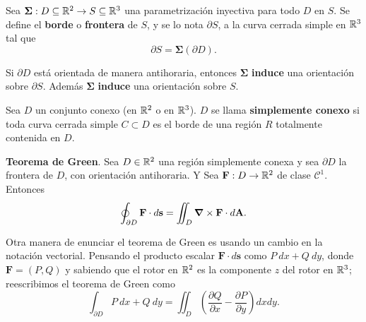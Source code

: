 \begin{definition}
    Sea $\boldsymbol{\Sigma}:D\subseteq\mathbb{R}^2\to S\subseteq\mathbb{R}^3$ una parametrizaci\'on inyectiva para todo $D$ en $S$. Se define el \textbf{borde} o \textbf{frontera} de $S$, y se lo nota $\partial S$, a la curva cerrada simple en $\mathbb{R}^3$ tal que 
    \[
        \partial S=\boldsymbol{\Sigma}(\partial D).
    \]
\end{definition}

\begin{obs} 
    Si $\partial D$ est\'a orientada de manera antihoraria, entonces $\boldsymbol{\Sigma}$ \textbf{induce} una orientaci\'on sobre $\partial S$. Adem\'as $\boldsymbol{\Sigma}$ \textbf{induce} una orientaci\'on sobre $S$.
\end{obs}

\begin{definition}
    Sea $D$ un conjunto conexo (en $\mathbb{R}^2$ o en $\mathbb{R}^3$). $D$ se llama \textbf{simplemente conexo} si toda curva cerrada simple $C\subset D$ es el borde de una regi\'on $R$ totalmente contenida en $D$.
\end{definition}

\begin{theorem}
    \textbf{Teorema de Green}. Sea $D\in\mathbb{R}^2$ una regi\'on simplemente conexa y sea $\partial D$ la frontera de $D$, con orientaci\'on antihoraria. Y Sea $\mathbf{F}:D\to\mathbb{R}^2$ de clase $\mathcal{C}^1$. Entonces
    \[
        \oint_{\partial D}\mathbf{F}\cdot d\mathbf{s} = \iint_D \grad\times\mathbf{F}\cdot d\mathbf{A}.
    \]
\end{theorem}

\begin{obs} 
    Otra manera de enunciar el teorema de Green es usando un cambio en la notaci\'on vectorial. Pensando el producto escalar $\mathbf{F}\cdot d\mathbf{s}$ como $P\:dx+Q\:dy$, donde $\mathbf{F}=(P,Q)$ y sabiendo que el rotor en $\mathbb{R}^2$ es la componente $z$ del rotor en $\mathbb{R}^3$; reescribimos el teorema de Green como
\[
        \int_{\partial D}P\:dx+Q\:dy=\iint_D\left(\frac{\partial Q}{\partial x}-\frac{\partial P}{\partial y}\right)dxdy.
\]
\end{obs}

